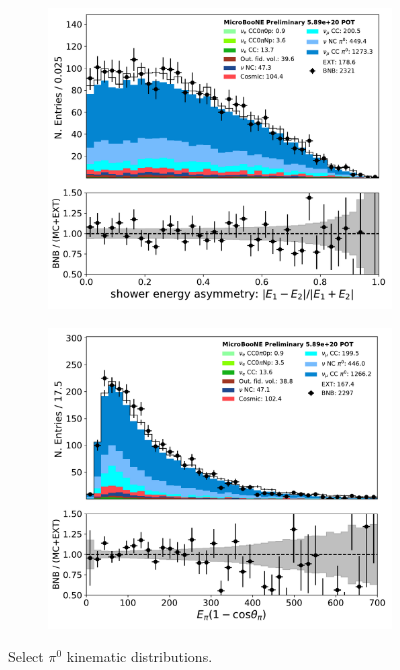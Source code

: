 \begin{figure}[H] 
\begin{center}
    \begin{subfigure}[b]{0.3\textwidth}
    \centering
    \includegraphics[width=1.00\textwidth]{pi0/kinematics/asymm_03112020_ALL_scaled.pdf}
    \caption{}
    \end{subfigure}
    \begin{subfigure}[b]{0.3\textwidth}
    \centering
    \includegraphics[width=1.00\textwidth]{pi0/kinematics/epicospi_03112020_ALL_scaled.pdf}
    \caption{}
    \end{subfigure}
\caption{Select $\pi^0$ kinematic distributions.}
\label{fig:pi0:kinematics:C}
\end{center}
\end{figure}



